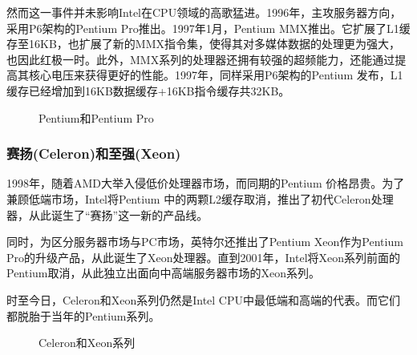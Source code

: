 \documentclass[UTF8]{ctexart}
\begin{document}
然而这一事件并未影响Intel在CPU领域的高歌猛进。1996年，主攻服务器方向，采用P6架构的Pentium Pro推出。1997年1月，Pentium MMX推出。它扩展了L1缓存至16KB，也扩展了新的MMX指令集，使得其对多媒体数据的处理更为强大，也因此红极一时。此外，MMX系列的处理器还拥有较强的超频能力，还能通过提高其核心电压来获得更好的性能。1997年，同样采用P6架构的Pentium \uppercase\expandafter{}发布，L1缓存已经增加到16KB数据缓存+16KB指令缓存共32KB。
\begin{figure}[H]
    \centering
    \caption{Pentium和Pentium Pro}
\end{figure}

\subsubsection{赛扬(Celeron)和至强(Xeon)}
1998年，随着AMD大举入侵低价处理器市场，而同期的Pentium \uppercase\expandafter{}价格昂贵。为了兼顾低端市场，Intel将Pentium \uppercase\expandafter{}中的两颗L2缓存取消，推出了初代Celeron处理器，从此诞生了“赛扬”这一新的产品线。

同时，为区分服务器市场与PC市场，英特尔还推出了Pentium \uppercase\expandafter{} Xeon作为Pentium Pro的升级产品，从此诞生了Xeon处理器。直到2001年，Intel将Xeon系列前面的Pentium取消，从此独立出面向中高端服务器市场的Xeon系列。

时至今日，Celeron和Xeon系列仍然是Intel CPU中最低端和高端的代表。而它们都脱胎于当年的Pentium系列。
\begin{figure}[H]
    \centering
    \caption{Celeron和Xeon系列}
\end{figure}
\end{document}
